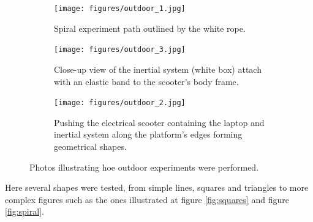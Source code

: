 \begin{figure}[!h]
  \centering
  \begin{subfigure}{0.8\textwidth}
    \centering
    \texttt{[image: figures/outdoor\_1.jpg]}
    \caption{ Spiral experiment path outlined by the white rope. }
    \label{fig:outdoor_1}
  \end{subfigure}

  \begin{subfigure}{0.40\textwidth}
    \centering
    \texttt{[image: figures/outdoor\_3.jpg]}
    \caption{ Close-up view of the inertial system (white box) attach with an elastic band to the scooter's body frame. }
    \label{fig:outdoor_2}
  \end{subfigure}
  \begin{subfigure}{0.40\textwidth}
    \centering
    \texttt{[image: figures/outdoor\_2.jpg]}
    \caption{ Pushing the electrical scooter containing the laptop and inertial system along the platform's edges forming geometrical shapes. }
    \label{fig:outdoor_3}
  \end{subfigure}
  \caption{ Photos illustrating hoe outdoor experiments were performed.}
  \label{fig:outdoor_experiments}
\end{figure}

Here several shapes were tested, from simple lines, squares and triangles to more complex figures such as the ones illustrated at figure \ref{fig:squares} and figure \ref{fig:spiral}.

